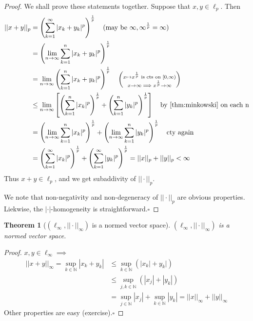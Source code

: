 \documentclass[11pt, oneside]{book}
\theoremstyle{break}
\newtheorem{thm}{Theorem}[section]
\newtheorem*{proof}{Proof}
\newcommand{\bb}[1]{\mathbb{#1}}			%
\newcommand{\qed}{\hfill\ensuremath{\square}}	%
\begin{document}
\begin{proof}
	We shall prove these statements together. Suppose that $x, y \in \ell_p$. Then
	\begin{align*}
		||x + y||_p &= \left( \sum_{k=1}^{\infty} |x_k + y_k|^p \right)^{\frac{1}{p}} \quad \text{(may be $\infty, \infty^{\frac{1}{p}} = \infty$)} \\
				&= \left( \lim_{n \to \infty} \sum_{k=1}^{n} |x_k + y_k|^p \right)^{\frac{1}{p}} \\
				&= \lim_{n \to \infty} \left( \sum_{k=1}^{n} |x_k + y_k|^p \right)^{\frac{1}{p}} \quad \left(\substack{x \mapsto x^{\frac{1}{p}} \text{ is cts on } [0, \infty) \\ x \to \infty \implies x^{\frac{1}{p}} \to \infty} \right) \\
				&\leq \lim_{n \to \infty} \left[ \left( \sum_{k=1}^{n} |x_k|^p \right)^{\frac{1}{p}} + \left( \sum_{k=1}^{n} |y_k|^p \right)^{\frac{1}{p}} \right] \quad \text{by \autoref{thm:minkowski} on each n} \\
				&= \left( \lim_{n \to \infty} \sum_{k=1}^{n} |x_k|^p \right)^{\frac{1}{p}} + \left( \lim_{n \to \infty} \sum_{k=1}^{n} |y_k|^p \right)^{\frac{1}{p}} \quad \text{cty again} \\
				&= \left( \sum_{k=1}^{\infty} |x_k|^p \right)^{\frac{1}{p}} + \left( \sum_{k=1}^{\infty} |y_k|^p \right)^{\frac{1}{p}} = ||x||_p + ||y||_p < \infty
	\end{align*}
	 Thus $x + y \in \ell_p$, and we get subaddivity of $||\cdot||_p$.

	 We note that non-negativity and non-degeneracy of $||\cdot||_p$ are obvious properties. Liekwise, the $|\cdot|$-homogeneity is straightforward.\qed
\end{proof}

\begin{thm}[$(\ell_\infty, ||\cdot||_\infty)$ is a normed vector space]
	$(\ell_\infty, ||\cdot||_\infty)$ is a normed vector space.
\end{thm}

\begin{proof}
	$x, y \in \ell_\infty \implies$
	\begin{align*}
		||x + y||_\infty = \sup_{k \in \bb{N}} |x_k + y_k| &\leq \sup_{k \in \bb{N}} (|x_k| + y_k|) \\
				&\leq \sup_{j, k \in \bb{N}} (|x_j| + |y_k|) \\
				&= \sup_{j \in \bb{N}} |x_j| + \sup_{k \in \bb{N}} |y_k| = ||x||_\infty + ||y||_\infty
	\end{align*}
	Other properties are easy (exercise).\qed
\end{proof}
\end{document}
